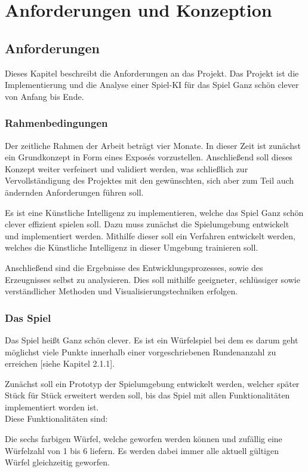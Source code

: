 \section{Anforderungen und Konzeption}
\subsection{Anforderungen}
Dieses Kapitel beschreibt die Anforderungen an das Projekt. Das Projekt ist die Implementierung und die Analyse einer Spiel-KI für das Spiel Ganz schön clever von Anfang bis Ende.
\subsubsection{Rahmenbedingungen}
Der zeitliche Rahmen der Arbeit beträgt vier Monate. In dieser Zeit ist zunächst ein Grundkonzept in Form eines Exposés vorzustellen. Anschließend soll dieses Konzept weiter verfeinert und validiert werden, was schließlich zur Vervollständigung des Projektes mit den gewünschten, sich aber zum Teil auch ändernden Anforderungen führen soll. 

Es ist eine Künstliche Intelligenz zu implementieren, welche das Spiel Ganz schön clever effizient spielen soll. Dazu muss zunächst die Spielumgebung entwickelt und implementiert werden. Mithilfe dieser soll ein Verfahren entwickelt werden, welches die Künstliche Intelligenz in dieser Umgebung trainieren soll.

Anschließend sind die Ergebnisse des Entwicklungsprozesses, sowie des Erzeugnisses selbst zu analysieren. Dies soll mithilfe geeigneter, schlüssiger sowie verständlicher Methoden und Visualisierungstechniken erfolgen.
\subsubsection{Das Spiel}
Das Spiel heißt Ganz schön clever. Es ist ein Würfelspiel bei dem es darum geht möglichst viele Punkte innerhalb einer vorgeschriebenen Rundenanzahl zu erreichen [siehe Kapitel 2.1.1].

Zunächst soll ein Prototyp der Spielumgebung entwickelt werden, welcher später Stück für Stück erweitert werden soll, bis das Spiel mit allen Funktionalitäten implementiert worden ist.\\

Diese Funktionalitäten sind:

Die sechs farbigen Würfel, welche geworfen werden können und zufällig eine Würfelzahl von 1 bis 6 liefern. Es werden dabei immer alle aktuell gültigen Würfel gleichzeitig geworfen.

